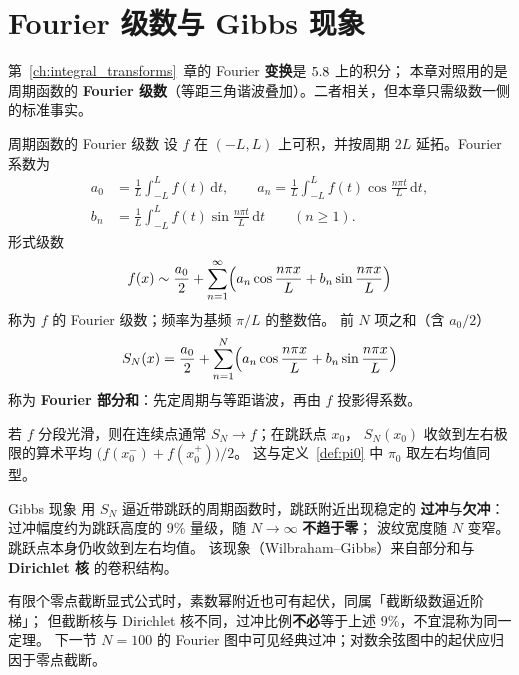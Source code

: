 \section{Fourier 级数与 Gibbs 现象}\label{sec:fourier_gibbs}

第~\ref{ch:integral_transforms}~章的 Fourier \textbf{变换}是 $5.8$ 上的积分；
本章对照用的是周期函数的 \textbf{Fourier 级数}（等距三角谐波叠加）。二者相关，但本章只需级数一侧的标准事实。

\begin{definition}{周期函数的 Fourier 级数}{}\label{def:fourier_series}
设 $f$ 在 $(-L,L)$ 上可积，并按周期 $2L$ 延拓。Fourier 系数为
\begin{align*}
a_0&=\frac{1}{L}\int_{-L}^{L}f(t)\,\mathrm{d}t,\qquad
a_n=\frac{1}{L}\int_{-L}^{L}f(t)\cos\frac{n\pi t}{L}\,\mathrm{d}t,\\
b_n&=\frac{1}{L}\int_{-L}^{L}f(t)\sin\frac{n\pi t}{L}\,\mathrm{d}t
\qquad (n\ge 1).
\end{align*}
形式级数
\begin{equation}
f(x)\sim\frac{a_0}{2}+\sum_{n=1}^{\infty}
\Bigl(a_n\cos\frac{n\pi x}{L}+b_n\sin\frac{n\pi x}{L}\Bigr)
\label{eq:fourier}
\end{equation}
称为 $f$ 的 Fourier 级数；频率为基频 $\pi/L$ 的整数倍。
前 $N$ 项之和（含 $a_0/2$）
\begin{equation}
S_N(x)=\frac{a_0}{2}+\sum_{n=1}^{N}
\Bigl(a_n\cos\frac{n\pi x}{L}+b_n\sin\frac{n\pi x}{L}\Bigr)
\label{eq:fourier_partial}
\end{equation}
称为 \textbf{Fourier 部分和}：先定周期与等距谐波，再由 $f$ 投影得系数。
\end{definition}

若 $f$ 分段光滑，则在连续点通常 $S_N\to f$；在跳跃点 $x_0$，
$S_N(x_0)$ 收敛到左右极限的算术平均
$\bigl(f(x_0^-)+f(x_0^+)\bigr)/2$。
这与定义~\ref{def:pi0} 中 $\pi_0$ 取左右均值同型。

\begin{definition}{Gibbs 现象}{}\label{def:gibbs}
用 $S_N$ 逼近带跳跃的周期函数时，跳跃附近出现稳定的 \textbf{过冲}与\textbf{欠冲}：
过冲幅度约为跳跃高度的 $9\%$ 量级，随 $N\to\infty$ \textbf{不趋于零}；
波纹宽度随 $N$ 变窄。跳跃点本身仍收敛到左右均值。
该现象（Wilbraham--Gibbs）来自部分和与 \textbf{Dirichlet 核} 的卷积结构。
\end{definition}

有限个零点截断显式公式时，素数幂附近也可有起伏，同属「截断级数逼近阶梯」；
但截断核与 Dirichlet 核不同，过冲比例\textbf{不必}等于上述 $9\%$，不宜混称为同一定理。
下一节 $N=100$ 的 Fourier 图中可见经典过冲；对数余弦图中的起伏应归因于零点截断。

